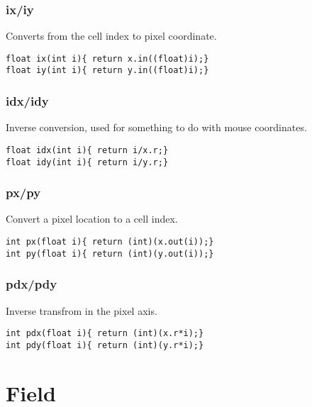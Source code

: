 \documentclass[notitlepage]{article}
\begin{document}
\subsubsection{ix/iy}

Converts from the cell index to pixel coordinate.

\begin{lstlisting}[style=myCpp]
float ix(int i){ return x.in((float)i);}
float iy(int i){ return y.in((float)i);}
\end{lstlisting}

\subsubsection{idx/idy}

Inverse conversion, used for something to do with mouse coordinates.

\begin{lstlisting}[style=myCpp]
float idx(int i){ return i/x.r;}
float idy(int i){ return i/y.r;}
\end{lstlisting}

\subsubsection{px/py}

Convert a pixel location to a cell index.

\begin{lstlisting}[style=myCpp]
int px(float i){ return (int)(x.out(i));}
int py(float i){ return (int)(y.out(i));}
\end{lstlisting}

\subsubsection{pdx/pdy}

Inverse transfrom in the pixel axis.

\begin{lstlisting}[style=myCpp]
int pdx(float i){ return (int)(x.r*i);}
int pdy(float i){ return (int)(y.r*i);}
\end{lstlisting}

\section{Field}

\end{document}
